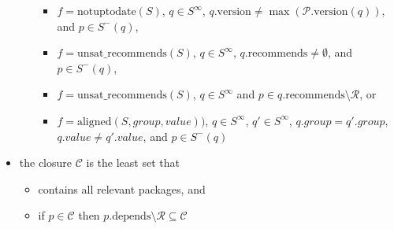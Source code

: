\documentclass[a4paper,english]{article}
\newcommand{\universe}{\mathcal{P}}
\newcommand{\closure}{\mathcal{C}}
\newcommand{\removed}{\mathcal{R}}
\newcommand{\version}{\mathrm{version}}
\newcommand{\recommends}{\mathrm{recommends}}
\newcommand{\depends}{\mathrm{depends}}
\newcommand{\funsatrecom}{\mathrm{unsat\_recommends}}
\newcommand{\faligned}{\mathrm{aligned}}
\newcommand{\fnotuptodate}{\mathrm{notuptodate}}
\newcommand{\selmax}{S^\infty}
\newcommand{\reasonmin}[1]{S^-(#1)}
\newcommand{\attr}[1]{\mathit{#1}}
\begin{document}
\begin{itemize}
\begin{itemize}
\begin{itemize}
          \item $f = \fnotuptodate(S)$, $q \in \selmax$, $q.\version \neq \max(\universe.\version(q))$, and $p \in \reasonmin{q}$,
          \item $f = \funsatrecom(S)$, $q \in \selmax$, $q.\recommends \neq \emptyset$, and $p \in \reasonmin{q}$,
          \item $f = \funsatrecom(S)$, $q \in \selmax$ and $p \in q.\recommends\setminus\removed$, or
          \item $f = \faligned(S,\attr{group},\attr{value}))$, $q\in \selmax$, $q' \in \selmax$, $q.\attr{group} = q'.\attr{group}$, $q.\attr{value} \neq q'.\attr{value}$, and $p \in \reasonmin{q}$\\
        \end{itemize}
    \end{itemize}
  \item the closure $\closure$ is the least set that
    \begin{itemize}
      \item contains all relevant packages, and
      \item if $p\in \closure$ then $p.\depends\setminus\removed\subseteq\closure$
    \end{itemize}
\end{itemize}
\end{document}
